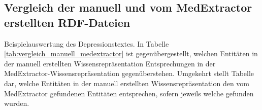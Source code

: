 

\subsection{Vergleich der manuell und vom MedExtractor erstellten RDF-Dateien}
\label{subsec: RDF-Vergleich} 


Beispielauswertung des Depressionstextes. In Tabelle \ref{tab:vergleich_manuell_medextractor} ist gegenübergestellt, welchen Entitäten in der manuell erstellten Wissensrepräsentation Entsprechungen in der MedExtractor-Wissensrepräsentation gegenüberstehen. Umgekehrt stellt Tabelle \label{tab:vergleich_manuell_medextractor} dar, welche Entitäten in der manuell erstellten Wissensrepräsentation den vom MedExtractor gefundenen Entitäten entsprechen, sofern jeweils welche gefunden wurden.

